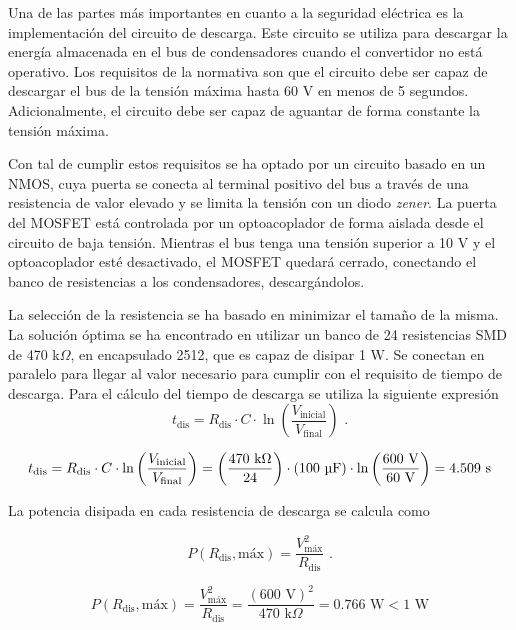 Una de las partes más importantes en cuanto a la seguridad eléctrica es la implementación del circuito de descarga. Este circuito se utiliza para descargar la energía almacenada en el bus de condensadores cuando el convertidor no está operativo. Los requisitos de la normativa son que el circuito debe ser capaz de descargar el bus de la tensión máxima hasta 60 V en menos de 5 segundos. Adicionalmente, el circuito debe ser capaz de aguantar de forma constante la tensión máxima.

Con tal de cumplir estos requisitos se ha optado por un circuito basado en un NMOS, cuya puerta se conecta al terminal positivo del bus a través de una resistencia de valor elevado y se limita la tensión con un diodo \textit{zener}. La puerta del MOSFET está controlada por un optoacoplador de forma aislada desde el circuito de baja tensión. Mientras el bus tenga una tensión superior a 10 V y el optoacoplador esté desactivado, el MOSFET quedará cerrado, conectando el banco de resistencias a los condensadores, descargándolos.

La selección de la resistencia se ha basado en minimizar el tamaño de la misma. La solución óptima se ha encontrado en utilizar un banco de 24 resistencias SMD de 470 k$\Omega$, en encapsulado 2512, que es capaz de disipar 1 W. Se conectan en paralelo para llegar al valor necesario para cumplir con el requisito de tiempo de descarga. Para el cálculo del tiempo de descarga se utiliza la siguiente expresión
\begin{equation}
	t_{\text{dis}} = R_{\text{dis}} \cdot C \cdot \ln\left(\frac{V_{\text{inicial}}}{V_{\text{final}}}\right)\text{ .}
\end{equation}

\[
t_{\text{dis}} = R_{\text{dis}} \cdot C \cdot \ln\left(\frac{V_{\text{inicial}}}{V_{\text{final}}}\right) = \left(\frac{470 \text{ k}\Omega}{24}\right) \cdot (100\text{ }\text{\unit{\micro\farad}}) \cdot \ln\left(\frac{600 \text{ V}}{60 \text{ V}}\right) = 4.509 \text{ s}
\] 

La potencia disipada en cada resistencia de descarga se calcula como

\begin{equation}
	P(R_{\text{dis}}, \text{máx}) = \frac{V_{\text{máx}}^2}{R_{\text{dis}}} \text{ .}
\end{equation}

\[
P(R_{\text{dis}}, \text{máx}) = \frac{V_{\text{máx}}^2}{R_{\text{dis}}} = \frac{(600\text{ V})^2}{470 \text{ k}\Omega} = 0.766 \text{ W} < 1 \text{ W}
\]

